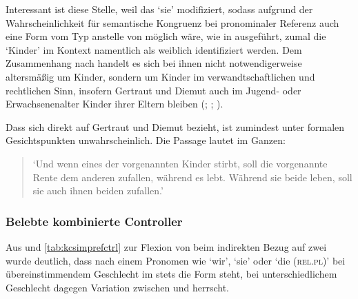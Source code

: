 Interessant ist diese Stelle, weil  das 
 `sie' modifiziert, sodass aufgrund der Wahrscheinlichkeit für
semantische Kongruenz bei pronominaler Referenz auch
eine Form vom Typ  anstelle von  möglich wäre, wie in
 ausgeführt, zumal die  `Kinder' im
Kontext namentlich als weiblich identifiziert werden. Dem
Zusammenhang nach handelt es sich bei ihnen nicht notwendigerweise altersmäßig
um Kinder, sondern um Kinder im verwandt\-schaft\-lichen und rechtlichen Sinn,
insofern Gertraut und Diemut auch im Jugend- oder Erwachsenen\-alter Kinder
ihrer Eltern bleiben (\cites(Nr.~2960)[240,31+35]{cao4};
\cites(Nr.~2719)[vgl.~auch][96,40--97,18]{cao4}; \cite[569, 619]{caor}).

Dass sich  direkt auf Gertraut und Diemut bezieht, ist
zumindest unter formalen Gesichtspunkten unwahrscheinlich. Die Passage lautet
im Ganzen:

\begin{quote}
	 \autocites(Nr.~2960)[240,37--39]{cao4}

`Und wenn eines der vorgenannten Kinder
stirbt, soll die vorgenannte Rente dem anderen zufallen, während es lebt.
Während sie beide leben, soll sie auch ihnen beiden zufallen.'
\end{quote}


\subsubsection{Belebte kombinierte Controller}

Aus  und \ref{tab:kcsimprefctrl} zur Flexion von
 beim indirekten Bezug auf zwei  wurde
deutlich, dass nach einem Pronomen wie  `wir',  `sie' oder
 `die (\textsc{rel.pl})' bei übereinstimmendem Geschlecht im \CAO{}
stets die Form  steht, bei unterschiedlichem Geschlecht dagegen
Variation zwischen   und 
 herrscht.

